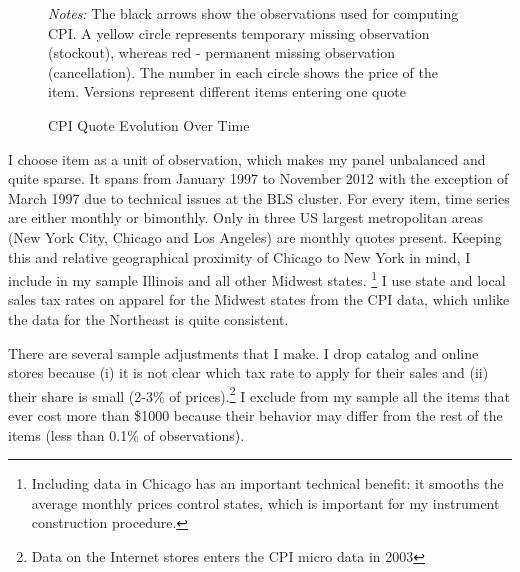 \documentclass[12pt]{article}
\begin{document}
\begin{figure}
\begin{tikzpicture}
					
					
					
					
					\end{tikzpicture}
					\caption{CPI Quote Evolution Over Time}
					\medskip
					\begin{minipage}{1\textwidth}
						{ \small \emph{Notes:} The black arrows show the observations used for computing CPI. A yellow circle represents temporary missing observation (stockout), whereas red - permanent missing observation (cancellation). The number in each circle shows the price of the item. Versions represent different items entering one quote}
					\end{minipage}
					\label{fig:evquote}
				\end{figure}
		
		

		
		
		
		
		
		I choose item as a unit of observation, which makes my panel unbalanced and quite sparse.  It spans from January 1997 to November 2012 with the exception of March 1997 due to technical issues at the BLS cluster. For every item, time series are either monthly or bimonthly. Only in three US largest metropolitan areas (New York City, Chicago and Los Angeles) are monthly quotes present. Keeping this and relative geographical proximity of Chicago to New York in mind, I include in my sample Illinois and all other Midwest states. \footnote{Including data in Chicago has an important technical benefit: it smooths the average monthly prices control states, which is important for my instrument construction procedure.} I use state and local sales tax rates on apparel for the Midwest states from the CPI data, which unlike the data for the Northeast is quite consistent.
		
		There are several sample adjustments that I make. I drop catalog and online stores because (i) it is not clear which tax rate to apply for their sales and (ii) their share is small (2-3\% of prices).\footnote{Data on the Internet stores enters the CPI micro data in 2003} I exclude from my sample all the items that ever cost more than \$1000 because their behavior may differ from the rest of the items (less than 0.1\% of observations). 
		
\end{document}
